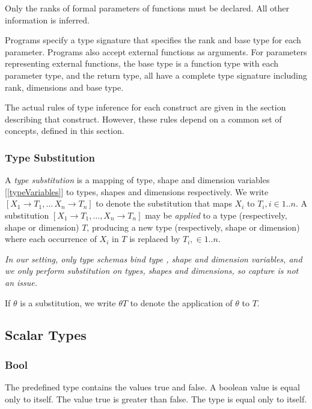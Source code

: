 \documentclass{article}
\begin{document}
{Only the ranks of formal parameters of functions must be declared. All other information is inferred.

Programs specify a type signature that specifies the rank and base type for each parameter. Programs also accept external functions as arguments.
For parameters representing external functions, the base type is  a function type with each parameter type, and the return type, all have a complete type signature including rank, dimensions and base type.

The actual rules of type inference for each construct are given in the section describing that construct. However, these rules depend on a common set of concepts, defined in this section.
 
  
  \subsubsection{Type Substitution}
  \label{typeSubstitution}
  
  A {\em type substitution} is a mapping of type, shape and dimension variables [\ref{typeVariables}] to types, shapes and dimensions respectively. We write $[X_1 \to T_1, \ldots\, X_n \to T_n]$ to denote the substitution that maps $X_i$ to $T_i, i \in 1..n$. A substitution $[X_1 \to T_1, \ldots, X_n \to T_n]$ may be {\em applied} to a type (respectively, shape or dimension) $T$, producing a new type (respectively, shape or dimension) where each occurrence of $X_i$ in $T$ is replaced by $T_i ,\in 1..n$.
  
  {\em 
  In our setting, only type schemas bind type , shape and dimension variables, and we only perform substitution on types, shapes and dimensions, so capture is not an issue.
  }
  
If $\theta$ is a substitution, we write $\theta T$ to denote the application of $\theta$ to $T$.


\subsection{Scalar Types}
\label{scalarTypes}

\subsubsection{Bool}
\label{bool}

The predefined type \BOOL{} contains the values true and false.  A boolean value is equal only to itself. The value true is greater than false. The type \BOOL{} is equal only to itself.

}
\end{document}
